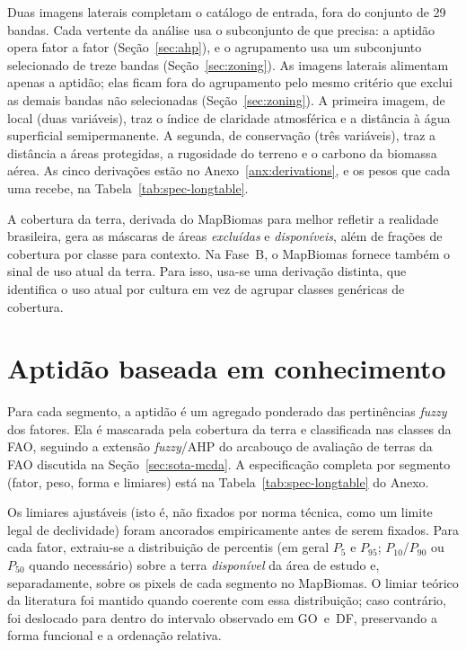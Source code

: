 Duas imagens laterais completam o catálogo de entrada, fora do conjunto de 29 bandas. Cada vertente
da análise usa o subconjunto de que precisa: a aptidão opera fator a fator (Seção~\ref{sec:ahp}), e o
agrupamento usa um subconjunto selecionado de treze bandas (Seção~\ref{sec:zoning}). As imagens laterais
alimentam apenas a aptidão; elas ficam fora do agrupamento pelo mesmo critério que exclui as demais
bandas não selecionadas (Seção~\ref{sec:zoning}). A primeira imagem, de local (duas variáveis), traz o
índice de claridade atmosférica e a distância à água superficial semipermanente. A segunda, de
conservação (três variáveis), traz a distância a áreas protegidas, a rugosidade do terreno e o carbono
da biomassa aérea. As cinco derivações estão no Anexo~\ref{anx:derivations}, e os pesos que cada uma
recebe, na Tabela~\ref{tab:spec-longtable}.

A cobertura da terra, derivada do MapBiomas para melhor refletir a realidade brasileira, gera as
máscaras de áreas \emph{excluídas} e \emph{disponíveis}, além de frações de cobertura por classe para
contexto. Na Fase~B, o MapBiomas fornece também o sinal de uso atual da terra. Para isso, usa-se uma
derivação distinta, que identifica o uso atual por cultura em vez de agrupar classes genéricas de
cobertura.

\section{Aptidão baseada em conhecimento}\label{sec:suitability}

Para cada segmento, a aptidão é um agregado ponderado das pertinências \emph{fuzzy} dos fatores. Ela é
mascarada pela cobertura da terra e classificada nas classes da FAO, seguindo a extensão \emph{fuzzy}/AHP
do arcabouço de avaliação de terras da FAO discutida na Seção~\ref{sec:sota-mcda}. A especificação
completa por segmento (fator, peso, forma e limiares) está na Tabela~\ref{tab:spec-longtable} do Anexo.

Os limiares ajustáveis (isto é, não fixados por norma técnica, como um limite legal de declividade)
foram ancorados empiricamente antes de serem fixados. Para cada fator, extraiu-se a distribuição de
percentis (em geral $P_5$ e $P_{95}$; $P_{10}$/$P_{90}$ ou $P_{50}$ quando necessário) sobre a terra
\emph{disponível} da área de estudo e, separadamente, sobre os pixels de cada segmento no MapBiomas.
O limiar teórico da literatura foi mantido quando coerente com essa distribuição; caso contrário, foi
deslocado para dentro do intervalo observado em GO~e~DF, preservando a forma funcional e a ordenação
relativa.

